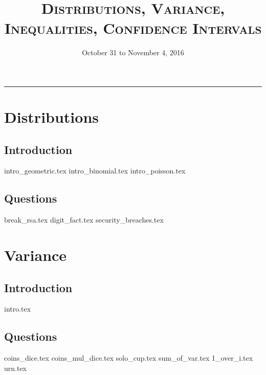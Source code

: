 \documentclass{exam}
\title{\textsc{Distributions, Variance, Inequalities, Confidence Intervals}}
\date{October 31 to November 4, 2016}
\begin{document}
\maketitle
\rule{\textwidth}{0.15em}
\fontsize{12}{15}\selectfont
\thispagestyle{empty}

\section{Distributions}
\subsection{Introduction}
{intro_geometric.tex}
{intro_binomial.tex}
{intro_poisson.tex}
\subsection{Questions}
\begin{questions}
{break_rsa.tex}
\clearpage
{digit_fact.tex}
{security_breaches.tex}
\end{questions}

\section{Variance}
\subsection{Introduction}
{intro.tex}
\subsection{Questions}
\begin{questions}
{coins_dice.tex}
{coins_mul_dice.tex}
{solo_cup.tex}
\clearpage
{sum_of_var.tex}
{1_over_i.tex}
{urn.tex}
\end{questions}
\end{document}

